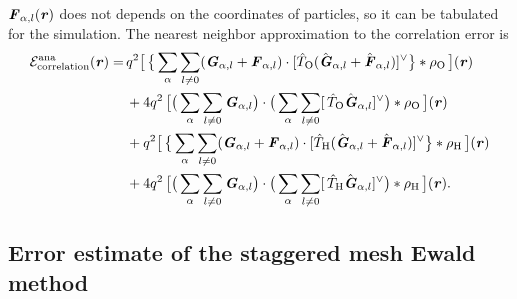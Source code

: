 \documentclass[journal=jacsat,manuscript=article]{achemso}
\renewcommand{\v}[1]{\textbf{\textit{#1}}}
\begin{document}
$\v F_{\alpha,l} (\v r)$ 
does not depends on the coordinates of particles,
so it can be tabulated  for the simulation.
The nearest neighbor approximation to the correlation error is
\begin{align}\nonumber
  \mathcal E^{\textrm{ana}}_{\textrm{correlation}}(\v r)
  =\,&
  q^2
  \big[\,
  \big\{
  \sum_{\alpha} \sum_{l\neq 0}
  (\v G_{\alpha,l}+\v F_{\alpha,l})\cdot
  [\hat T_{\textrm{O}} (\hat{\v G}_{\alpha,l}+\hat{\v F}_{\alpha,l})]^{\vee}
  \big\}
  \ast \rho_{\textrm{O}}
  \,\big] (\v r) \\\nonumber
  \,&+
  4q^2\,
  \big[
  \big(
  \sum_{\alpha} \sum_{l\neq 0}  
  \v G_{\alpha,l}
  \big)
  \cdot
  \big(
  \sum_{\alpha} \sum_{l\neq 0}  
  [\,\hat T_{\textrm{O}}\hat{\v G}_{\alpha,l}]^{\vee}
  \big)
  \ast \rho_{\textrm{O}}\,
  \big] (\v r) \\\nonumber
  \,&+
  q^2
  \big[\,
  \big\{
  \sum_{\alpha} \sum_{l\neq 0}
  (\v G_{\alpha,l}+\v F_{\alpha,l})\cdot
  [\hat T_{\textrm{H}} (\hat{\v G}_{\alpha,l}+\hat{\v F}_{\alpha,l})]^{\vee}
  \big\}
  \ast \rho_{\textrm{H}}
  \,\big] (\v r) \\
  \,&+
  4q^2\,
  \big[
  \big(
  \sum_{\alpha} \sum_{l\neq 0}  
  \v G_{\alpha,l}
  \big)
  \cdot
  \big(
  \sum_{\alpha} \sum_{l\neq 0}  
  [\,\hat T_{\textrm{H}}\hat{\v G}_{\alpha,l}]^{\vee}
  \big)
  \ast \rho_{\textrm{H}}\,
  \big] (\v r).
\end{align}



\subsection{Error estimate of the staggered mesh Ewald method}
\end{document}
